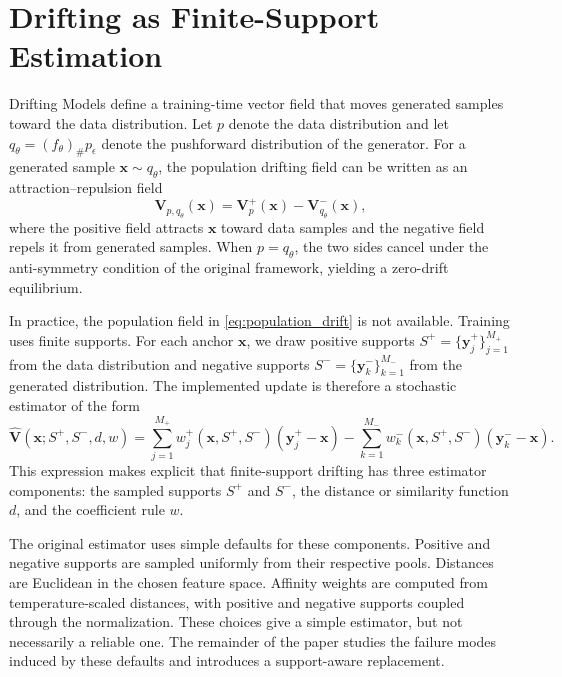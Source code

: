 \documentclass{article}
\newcommand{\V}{\mathbf{V}}
\newcommand{\x}{\mathbf{x}}
\newcommand{\yp}{\mathbf{y}^{+}}
\newcommand{\yn}{\mathbf{y}^{-}}
\begin{document}
\section{Drifting as Finite-Support Estimation}
\label{sec:finite_support}

Drifting Models define a training-time vector field that moves generated samples toward the data distribution.
Let $p$ denote the data distribution and let $q_\theta = (f_\theta)_\# p_\epsilon$ denote the pushforward distribution of the generator.
For a generated sample $\x \sim q_\theta$, the population drifting field can be written as an attraction--repulsion field
\begin{equation}
\V_{p,q_\theta}(\x)
=
\V^{+}_{p}(\x)
-
\V^{-}_{q_\theta}(\x),
\label{eq:population_drift}
\end{equation}
where the positive field attracts $\x$ toward data samples and the negative field repels it from generated samples.
When $p=q_\theta$, the two sides cancel under the anti-symmetry condition of the original framework, yielding a zero-drift equilibrium.

In practice, the population field in \cref{eq:population_drift} is not available.
Training uses finite supports.
For each anchor $\x$, we draw positive supports $S^+=\{\yp_j\}_{j=1}^{M_+}$ from the data distribution and negative supports $S^-=\{\yn_k\}_{k=1}^{M_-}$ from the generated distribution.
The implemented update is therefore a stochastic estimator of the form
\begin{equation}
\widehat{\V}(\x;S^+,S^-,d,w)
=
\sum_{j=1}^{M_+}
w_j^+(\x,S^+,S^-)
(\yp_j-\x)
-
\sum_{k=1}^{M_-}
w_k^-(\x,S^+,S^-)
(\yn_k-\x).
\label{eq:finite_support_estimator}
\end{equation}
This expression makes explicit that finite-support drifting has three estimator components:
the sampled supports $S^+$ and $S^-$, the distance or similarity function $d$, and the coefficient rule $w$.

The original estimator uses simple defaults for these components.
Positive and negative supports are sampled uniformly from their respective pools.
Distances are Euclidean in the chosen feature space.
Affinity weights are computed from temperature-scaled distances, with positive and negative supports coupled through the normalization.
These choices give a simple estimator, but not necessarily a reliable one.
The remainder of the paper studies the failure modes induced by these defaults and introduces a support-aware replacement.
\end{document}
